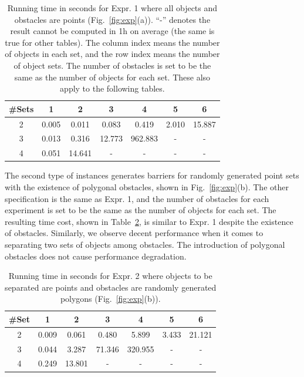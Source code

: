 \begin{table}[ht]
    \centering
    \begin{tabular}{|c|c|c|c|c|c|c|}\hline
        \#Sets &  1 & 2 & 3 & 4& 5& 6\\\hline
 2& 0.005 & 0.011 & 0.083 & 0.419 & 2.010 & 15.887 \\\hline
 3& 0.013 & 0.316 & 12.773 & 962.883 & - & - \\\hline
 4& 0.051 & 14.641 &  -& - &  -&- \\\hline
\end{tabular}
    \caption{Running time in seconds for Expr. 1 where all objects and obstacles are points (Fig.~\ref{fig:exp}(a)). ``-'' denotes the result cannot be computed in 1h on average (the same is true for other tables). 
    The column index means the number of objects in each set, and the row index means the number of object sets.
    The number of obstacles is set to be the same as the number of objects for each set. These also apply to the following tables.
    }
    \label{tab:expr_1}
\end{table}

 The second type of instances generates barriers for randomly generated 
 point sets with the existence of polygonal obstacles, shown in Fig.~\ref{fig:exp}(b). 
 The other specification is the same as Expr. 1, and the number of obstacles for each experiment is set to be the same as the number of objects for each set. 
 The resulting time cost, shown in Table~\ref{tab:expr_2}, is similar to Expr. 1 despite the existence of obstacles.
 Similarly, we observe decent performance when it comes to separating two sets of objects among obstacles. 
 The introduction of polygonal obstacles does not cause performance degradation. 


\begin{table}[ht]
    \centering
    \begin{tabular}{|c|c|c|c|c|c|c|}\hline
        \#Set &  1 & 2 & 3 & 4& 5& 6\\\hline
2& 0.009 & 0.061 & 0.480 & 5.899 & 3.433 & 21.121\\\hline
 3& 0.044 & 3.287 & 71.346 & 320.955 & - & -\\\hline
 4& 0.249 & 13.801 & - & - & - & -\\\hline
    \end{tabular}
    \caption{Running time in seconds for Expr. 2 where objects to be separated are points and obstacles are randomly generated polygons (Fig.~\ref{fig:exp}(b)). 
    }
    \label{tab:expr_2}
    \vspace{-2mm}
\end{table}
 

